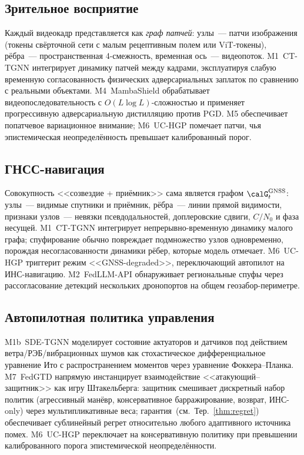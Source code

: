 \subsection{Зрительное восприятие}
\label{sec:uav_vision}
Каждый видеокадр представляется как \emph{граф патчей}: узлы~--- патчи
изображения (токены свёрточной сети с малым рецептивным полем или
ViT-токены), рёбра~--- пространственная 4-смежность, временная ось~---
видеопоток. \textsf{M1~CT-TGNN} интегрирует динамику патчей между
кадрами, эксплуатируя слабую временную согласованность физических
адверсариальных заплаток по сравнению с реальными объектами.
\textsf{M4~MambaShield} обрабатывает видеопоследовательность с
$O(L\log L)$-сложностью и применяет прогрессивную адверсариальную
дистилляцию против PGD. \textsf{M5} обеспечивает попатчевое
вариационное внимание; \textsf{M6~UC-HGP} помечает патчи, чья
эпистемическая неопределённость превышает калиброванный порог.
\subsection{ГНСС-навигация}
\label{sec:uav_gnss}
Совокупность <<созвездие + приёмник>> сама является графом
$\calG_t^{\text{GNSS}}$: узлы~--- видимые спутники и приёмник, рёбра~---
линии прямой видимости, признаки узлов~--- невязки псевдодальностей,
доплеровские сдвиги, $C/N_0$ и фаза несущей. \textsf{M1~CT-TGNN}
интегрирует непрерывно-временную динамику малого графа; спуфирование
обычно повреждает подмножество узлов одновременно, порождая
несогласованности динамики рёбер, которые модель отмечает.
\textsf{M6~UC-HGP} триггерит режим <<GNSS-degraded>>, переключающий
автопилот на ИНС-навигацию. \textsf{M2~FedLLM-API} обнаруживает
региональные спуфы через рассогласование детекций нескольких
дронопортов на общем геозабор-периметре.
\subsection{Автопилотная политика управления}
\label{sec:uav_autopilot}
\textsf{M1b~SDE-TGNN} моделирует состояние актуаторов и датчиков под
действием ветра/РЭБ/вибрационных шумов как стохастическое
дифференциальное уравнение Ито с распространением моментов через
уравнение Фоккера--Планка. \textsf{M7~FedGTD} напрямую инстанцирует
взаимодействие <<атакующий--защитник>> как игру Штакельберга:
защитник смешивает дискретный набор политик (агрессивный манёвр,
консервативное барражирование, возврат, ИНС-only) через
мультипликативные веса; гарантия~(см.\ Тер.~\ref{thm:regret}) обеспечивает
сублинейный регрет относительно любого адаптивного источника помех.
\textsf{M6~UC-HGP} переключает на консервативную политику при
превышении калиброванного порога эпистемической неопределённости.
